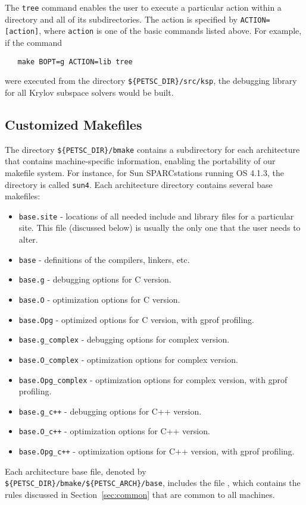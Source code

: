 {The {\tt tree} command enables the user to execute a particular action
within a directory and all of its subdirectories.  The action is specified
by {\tt ACTION=[action]}, where {\tt action} is one of the basic commands
listed above. For example, if the command
\begin{verbatim}
   make BOPT=g ACTION=lib tree
\end{verbatim}
were executed from the directory {\tt \$\{PETSC\_DIR\}/src/ksp},
the debugging library for all Krylov subspace solvers would be built.

\subsection{Customized Makefiles}
\label{sec:custom}

The directory {\tt \$\{PETSC\_DIR\}/bmake} contains a subdirectory for each 
architecture that contains machine-specific information, enabling the
portability of our makefile system.
For instance, for Sun SPARCstations running OS 4.1.3, the 
directory is called {\tt sun4}.  Each architecture directory contains
several base makefiles:
\begin{itemize}
\item {\tt base.site} - locations of all needed include
      and library files for a particular site. This file (discussed
      below) is usually the only one that the user needs to alter.
\item {\tt base} - definitions of the compilers,
      linkers, etc.
\item {\tt base.g} - debugging options for C version.
\item {\tt base.O} - optimization options for C version.
\item {\tt base.Opg} - optimized options for C version, with gprof profiling.
\item {\tt base.g\_complex} - debugging options for complex version.
\item {\tt base.O\_complex} - optimization options for complex version.
\item {\tt base.Opg\_complex} - optimization options for complex version, with 
                              gprof profiling.
\item {\tt base.g\_c++} - debugging options for C++ version.
\item {\tt base.O\_c++} - optimization options for C++ version.
\item {\tt base.Opg\_c++} - optimization options for C++ version, with gprof
                            profiling.
\end{itemize}
Each architecture base file, denoted by
{\tt \$\{PETSC\_DIR\}/bmake/\$\{PETSC\_ARCH\}/base},
includes the file ,
which contains the rules discussed in Section~\ref{sec:common}
that are common to all machines.

}

